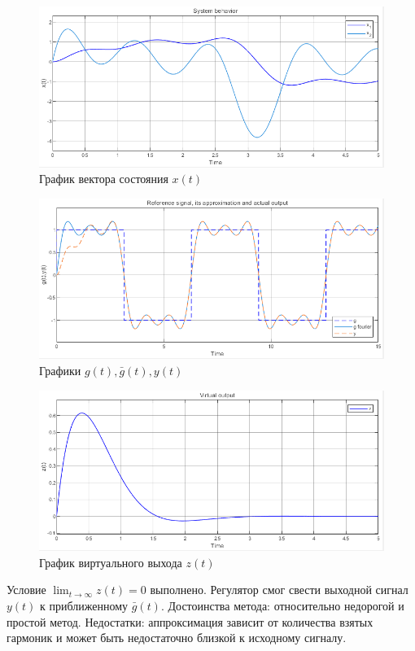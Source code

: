 \documentclass[a4paper, 12pt]{article}
\begin{document}
    \begin{figure}[H]
        \centering
        \includegraphics[scale=0.75]{4task_x.png}
        \captionsetup{skip=0pt}
        \caption{График вектора состояния $x(t)$}
        \label{fig:4task_x}
    \end{figure}
    \begin{figure}[H]
        \centering
        \includegraphics[scale=0.75]{4task_gbgy.png}
        \captionsetup{skip=0pt}
        \caption{Графики $g(t),\bar{g}(t),y(t)$}
        \label{fig:4task_gbgy}
    \end{figure}
    \begin{figure}[H]
        \centering
        \includegraphics[scale=0.75]{4task_z.png}
        \captionsetup{skip=0pt}
        \caption{График виртуального выхода $z(t)$}
        \label{fig:4task_z}
    \end{figure}
    \noindent Условие $\lim_{t\to\infty}z(t)=0$ выполнено.
    Регулятор смог свести выходной сигнал $y(t)$
    к приближенному $\bar{g}(t)$. Достоинства метода: относительно недорогой
    и простой метод. Недостатки: аппроксимация зависит от количества взятых гармоник и
    может быть недостаточно близкой к исходному сигналу.
\end{document}
